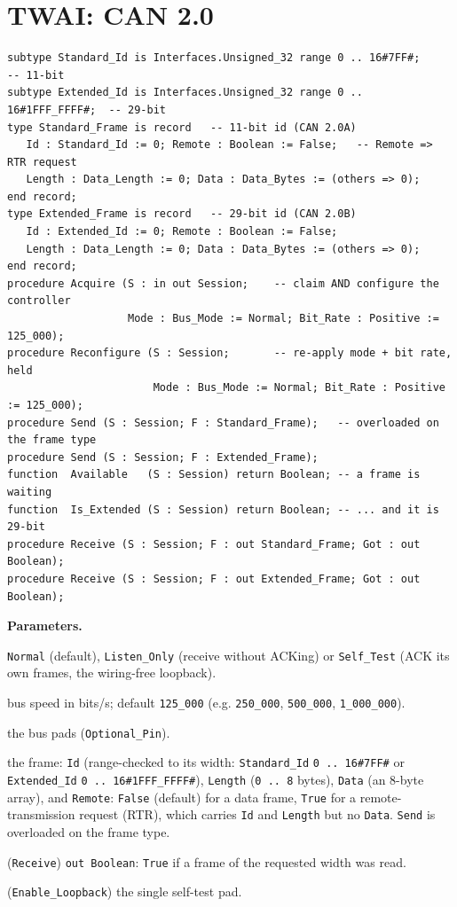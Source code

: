 \section{TWAI: CAN 2.0}

\begin{lstlisting}
subtype Standard_Id is Interfaces.Unsigned_32 range 0 .. 16#7FF#;        -- 11-bit
subtype Extended_Id is Interfaces.Unsigned_32 range 0 .. 16#1FFF_FFFF#;  -- 29-bit
type Standard_Frame is record   -- 11-bit id (CAN 2.0A)
   Id : Standard_Id := 0; Remote : Boolean := False;   -- Remote => RTR request
   Length : Data_Length := 0; Data : Data_Bytes := (others => 0);
end record;
type Extended_Frame is record   -- 29-bit id (CAN 2.0B)
   Id : Extended_Id := 0; Remote : Boolean := False;
   Length : Data_Length := 0; Data : Data_Bytes := (others => 0);
end record;
procedure Acquire (S : in out Session;    -- claim AND configure the controller
                   Mode : Bus_Mode := Normal; Bit_Rate : Positive := 125_000);
procedure Reconfigure (S : Session;       -- re-apply mode + bit rate, held
                       Mode : Bus_Mode := Normal; Bit_Rate : Positive := 125_000);
procedure Send (S : Session; F : Standard_Frame);   -- overloaded on the frame type
procedure Send (S : Session; F : Extended_Frame);
function  Available   (S : Session) return Boolean; -- a frame is waiting
function  Is_Extended (S : Session) return Boolean; -- ... and it is 29-bit
procedure Receive (S : Session; F : out Standard_Frame; Got : out Boolean);
procedure Receive (S : Session; F : out Extended_Frame; Got : out Boolean);
\end{lstlisting}

\textbf{Parameters.}
\begin{description}[style=nextline]
\item[\texttt{Mode}] \texttt{Normal} (default), \texttt{Listen\_Only} (receive
  without ACKing) or \texttt{Self\_Test} (ACK its own frames, the wiring-free
  loopback).
\item[\texttt{Bit\_Rate}] bus speed in bits/s; default \texttt{125\_000} (e.g.
  \texttt{250\_000}, \texttt{500\_000}, \texttt{1\_000\_000}).
\item[\texttt{Tx}, \texttt{Rx}] the bus pads (\texttt{Optional\_Pin}).
\item[\texttt{F} (\texttt{Standard\_Frame} / \texttt{Extended\_Frame})] the frame:
  \texttt{Id} (range-checked to its width: \texttt{Standard\_Id}
  \texttt{0\,..\,16\#7FF\#} or \texttt{Extended\_Id}
  \texttt{0\,..\,16\#1FFF\_FFFF\#}), \texttt{Length} (\texttt{0\,..\,8} bytes),
  \texttt{Data} (an 8-byte array), and \texttt{Remote}: \texttt{False} (default)
  for a data frame, \texttt{True} for a remote-transmission request (RTR), which
  carries \texttt{Id} and \texttt{Length} but no \texttt{Data}. \texttt{Send} is
  overloaded on the frame type.
\item[\texttt{Got}] (\texttt{Receive}) \texttt{out Boolean}: \texttt{True} if a
  frame of the requested width was read.
\item[\texttt{Pad}] (\texttt{Enable\_Loopback}) the single self-test pad.
\end{description}

